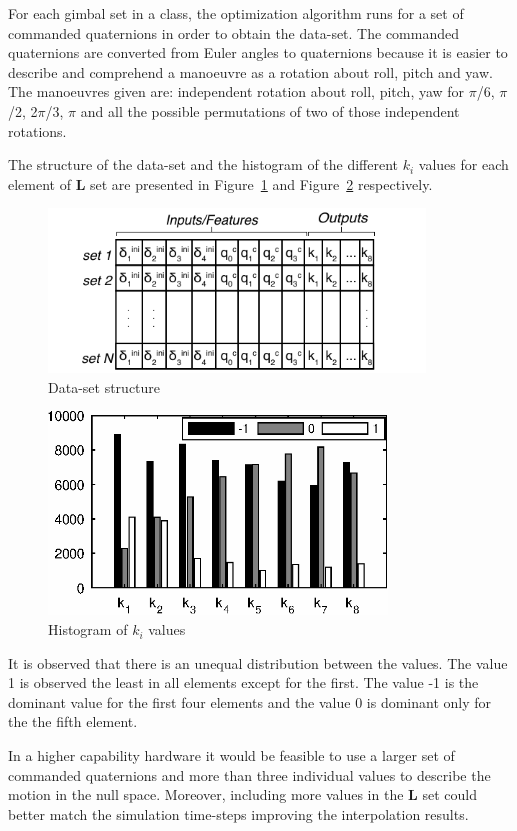 \documentclass[aerospace,article,submit,moreauthors,dvi2pdf]{Definitions/mdpi}
\begin{document}
For each gimbal set in a class, the optimization algorithm runs for a set of commanded quaternions in order to obtain the data-set.
The commanded quaternions are converted from Euler angles to quaternions because it is easier to describe and comprehend a manoeuvre as a rotation about roll, pitch and yaw. The manoeuvres given are: independent rotation about roll, pitch, yaw for $\pi$/6, $\pi$/2, 2$\pi$/3, $\pi$ and all the possible permutations of two of those independent rotations.

The structure of the data-set and the histogram of the different $k_i$ values for each element of $\textbf{L}$ set are presented in Figure~\ref{fig:dataset} and Figure~\ref{fig:instances_hist} respectively.
\begin{figure}[H]
\includegraphics[width=10cm]{chara3.pdf}
\caption{\label{fig:dataset}Data-set structure}
\end{figure}

\begin{figure}[H]
\includegraphics[width=9cm]{chara4.eps}
\caption{\label{fig:instances_hist}Histogram of $k_i$ values}
\end{figure}
It is observed that there is an unequal distribution between the values. The value 1 is observed the least in all elements except for the first. The value -1 is the dominant value for the first four elements and the value 0 is dominant only for the the fifth element.

In a higher capability hardware it would be feasible to use a larger set of commanded quaternions and more than three individual values to describe the motion in the null space. Moreover, including more values in the $\textbf{L}$ set could better match the simulation time-steps improving the interpolation results.
\end{document}
